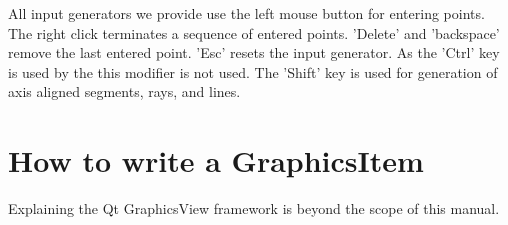 All input generators we provide use the left mouse button for entering points.
The right click terminates a sequence of entered points. 'Delete' and 'backspace'
remove the last entered point. 'Esc' resets the input generator.  As the 'Ctrl' key
is used by the  this modifier is not used.  The 'Shift'
key is used for generation of axis aligned segments, rays, and lines. 

\section{How to write a GraphicsItem} 

Explaining the Qt GraphicsView framework is beyond the scope of this manual.
